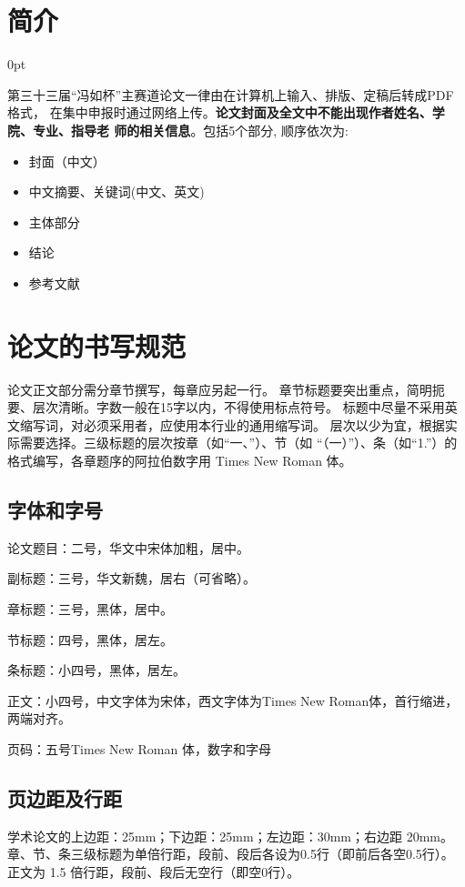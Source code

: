 \documentclass[zihao=-4]{ctexart}
\newcommand{\setParDis}{\setlength {\parskip} {0pt} }
\begin{document}
\section{简介}
\setParDis %
\begin{spacing}{1.5}
  第三十三届“冯如杯”主赛道论文一律由在计算机上输入、排版、定稿后转成PDF格式，
在集中申报时通过网络上传。\textbf{论文封面及全文中不能出现作者姓名、学院、专业、指导老
师的相关信息}。包括5个部分, 顺序依次为: \par 
  \begin{itemize}
    \item 封面（中文）
    \item 中文摘要、关键词(中文、英文)
    \item 主体部分
    \item 结论
    \item 参考文献
  \end{itemize}

\section{论文的书写规范}

论文正文部分需分章节撰写，每章应另起一行。
章节标题要突出重点，简明扼要、层次清晰。字数一般在15字以内，不得使用标点符号。
标题中尽量不采用英文缩写词，对必须采用者，应使用本行业的通用缩写词。  层次以少为宜，根据实际需要选择。三级标题的层次按章（如“一、”）、节（如 “（一）”）、条（如“1.”）的格式编写，各章题序的阿拉伯数字用 Times New Roman 体。  

\subsection{字体和字号}
论文题目：二号，华文中宋体加粗，居中。

副标题：三号，华文新魏，居右（可省略）。

章标题：三号，黑体，居中。

节标题：四号，黑体，居左。

条标题：小四号，黑体，居左。

正文：小四号，中文字体为宋体，西文字体为Times New Roman体，首行缩进，两端对齐。

页码：五号Times New Roman 体，数字和字母\par

\subsection{页边距及行距}
学术论文的上边距：25mm；下边距：25mm；左边距：30mm；右边距 20mm。
章、节、条三级标题为单倍行距，段前、段后各设为0.5行（即前后各空0.5行）。
正文为 1.5 倍行距，段前、段后无空行（即空0行）。


\end{spacing}
\end{document}
